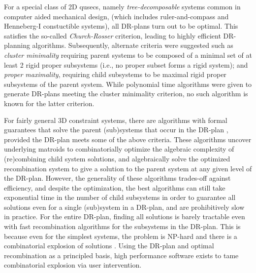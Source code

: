  
\medskip\noindent{}
For a special class of 2D qusecs, namely  {\em tree-decomposable} systems \cite{XX} common in computer aided mechanical design, 
(which includes ruler-and-compass and Henneberg-I constuctible systems), all DR-plans turn out to 
be optimal. This satisfies the so-called {\em Church-Rosser} criterion, leading to highly efficient DR-planning algorithms.
Subsequently, alternate criteria were suggested   
such as {\em cluster minimality} 
requiring parent systems to be composed of  
a minimal set of at least 2 rigid proper subsystems (i.e., no proper subset forms a rigid system); 
and {\em proper maximality}, requiring child subsystems
to be maximal rigid proper subsystems of the parent system.
While polynomial time algorithms were given \cite{XX} to generate DR-plans meeting the cluster minimality criterion,
no such algorithm is known for the latter criterion.

 
\medskip\noindent{}
For fairly general 3D constraint systems, there are algorithms with formal guarantees that 
solve the parent (sub)systems that occur in the DR-plan \cite{XX, XX,XX}, 
provided the DR-plan meets some of the above criteria.
These algorithms  uncover underlying matroids to combinatorially optimize the algebraic complexity of (re)combining child system solutions, 
and algebraically solve the optimized recombination system to give a solution to the parent system at any
given level of the DR-plan. However, the generality of these algorithms trades-off against efficiency, and despite the optimization,
the best algorithms can still take
exponential time in the number of child subsystems in order to guarantee all solutions even for a single (sub)system in a DR-plan, 
and are prohibitively slow in practice. For the entire DR-plan, finding all solutions is barely tractable even with fast recombination algorithms
for the subsystems in the DR-plan. This is because even for the simplest systems, the problem is NP-hard \cite{XX} and there is a 
combinatorial explosion of solutions \cite{XX}.  Using the DR-plan and optimal recombination as a principled basis, high performance software exists \cite{XX,XX} to 
tame combinatorial explosion via user intervention.

